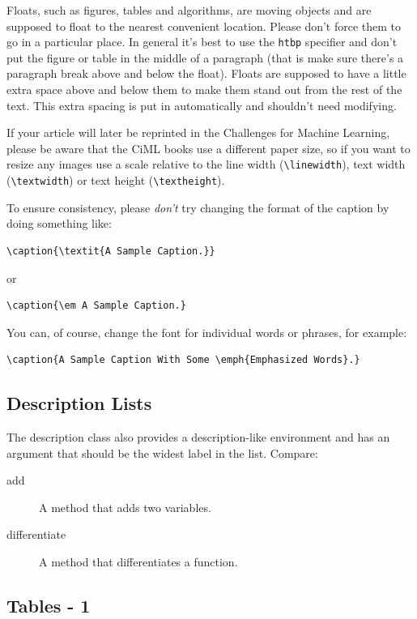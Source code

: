 \documentclass[ml4h-mathphys]{ml4h-jnl}%
\theoremstyle{thmstyleone}%
\theoremstyle{thmstyletwo}%
\theoremstyle{thmstylethree}%
\begin{document}
Floats, such as figures, tables and algorithms, are moving
objects and are supposed to float to the nearest convenient
location. Please don't force them to go in a particular place. In
general it's best to use the \texttt{htbp} specifier and don't
put the figure or table in the middle of a paragraph (that is
make sure there's a paragraph break above and below the float).
Floats are supposed to have a little extra space above and below
them to make them stand out from the rest of the text. This extra
spacing is put in automatically and shouldn't need modifying.

If your article will later be reprinted in the Challenges for
Machine Learning, please be aware that the CiML books use a
different paper size, so if you want to resize any images use a
scale relative to the line width (\verb|\linewidth|), text width
(\verb|\textwidth|) or text height (\verb|\textheight|).

To ensure consistency, please \emph{don't} try changing the format of the caption by doing
something like:
\begin{verbatim}
\caption{\textit{A Sample Caption.}}
\end{verbatim}
or
\begin{verbatim}
\caption{\em A Sample Caption.}
\end{verbatim}
You can, of course, change the font for individual words or 
phrases, for example:
\begin{verbatim}
\caption{A Sample Caption With Some \emph{Emphasized Words}.}
\end{verbatim}


\subsection{Description Lists}

The description class also provides a description-like 
environment and has an
argument that should be the widest label in the list. Compare:
\begin{description}
\item[add] A method that adds two variables.
\item[differentiate] A method that differentiates a function.
\end{description}

\subsection{Tables - 1}
\label{sec:tables}
\end{document}
